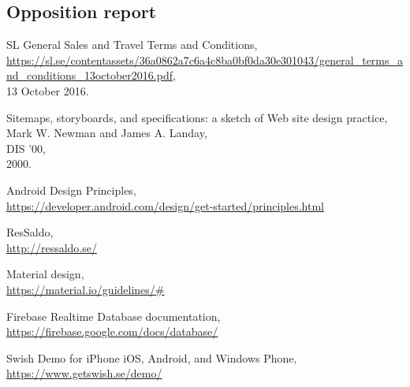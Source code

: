 \documentclass[11pt,twoside,a4paper]{report}
\begin{document}
\begin{appendices}
\chapter{Opposition report}
\label{appendix:opposition-report}
\newpage



\end{appendices}

\begin{thebibliography}{9}

SL General Sales and Travel Terms and Conditions,\\
\url{https://sl.se/contentassets/36a0862a7c6a4c8ba0bf0da30e301043/general_terms_and_conditions_13october2016.pdf},\\
13 October 2016.

Sitemaps, storyboards, and specifications: a sketch of Web site design practice,\\
Mark W. Newman and James A. Landay,\\
DIS '00,\\
2000.

Android Design Principles,\\
\url{https://developer.android.com/design/get-started/principles.html}

ResSaldo,\\
\url{http://ressaldo.se/}

Material design,\\
\url{https://material.io/guidelines/#} 

Firebase Realtime Database documentation,\\
\url{https://firebase.google.com/docs/database/}

Swish Demo for iPhone iOS, Android, and Windows Phone,\\
\url{https://www.getswish.se/demo/}

\end{thebibliography}
\end{document}
